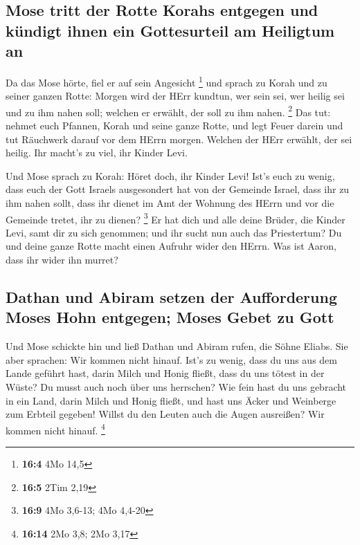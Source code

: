 \hypertarget{mose-tritt-der-rotte-korahs-entgegen-und-kuxfcndigt-ihnen-ein-gottesurteil-am-heiligtum-an}{%
\subsection{Mose tritt der Rotte Korahs entgegen und kündigt ihnen ein
Gottesurteil am Heiligtum
an}\label{mose-tritt-der-rotte-korahs-entgegen-und-kuxfcndigt-ihnen-ein-gottesurteil-am-heiligtum-an}}

 Da das Mose hörte, fiel er auf sein Angesicht \footnote{\textbf{16:4}
  4Mo 14,5}  und sprach zu Korah und zu seiner ganzen
Rotte: Morgen wird der HErr kundtun, wer sein sei, wer heilig sei und zu
ihm nahen soll; welchen er erwählt, der soll zu ihm nahen. \footnote{\textbf{16:5}
  2Tim 2,19}  Das tut: nehmet euch Pfannen, Korah und
seine ganze Rotte,  und legt Feuer darein und tut
Räuchwerk darauf vor dem HErrn morgen. Welchen der HErr erwählt, der sei
heilig. Ihr macht's zu viel, ihr Kinder Levi.

 Und Mose sprach zu Korah: Höret doch, ihr Kinder Levi!
 Ist's euch zu wenig, dass euch der Gott Israels
ausgesondert hat von der Gemeinde Israel, dass ihr zu ihm nahen sollt,
dass ihr dienet im Amt der Wohnung des HErrn und vor die Gemeinde
tretet, ihr zu dienen? \footnote{\textbf{16:9} 4Mo 3,6-13; 4Mo 4,4-20}
 Er hat dich und alle deine Brüder, die Kinder Levi, samt
dir zu sich genommen; und ihr sucht nun auch das Priestertum?
 Du und deine ganze Rotte macht einen Aufruhr wider den
HErrn. Was ist Aaron, dass ihr wider ihn murret?

\hypertarget{dathan-und-abiram-setzen-der-aufforderung-moses-hohn-entgegen-moses-gebet-zu-gott}{%
\subsection{Dathan und Abiram setzen der Aufforderung Moses Hohn
entgegen; Moses Gebet zu
Gott}\label{dathan-und-abiram-setzen-der-aufforderung-moses-hohn-entgegen-moses-gebet-zu-gott}}

 Und Mose schickte hin und ließ Dathan und Abiram rufen,
die Söhne Eliabs. Sie aber sprachen: Wir kommen nicht hinauf.
 Ist's zu wenig, dass du uns aus dem Lande geführt hast,
darin Milch und Honig fließt, dass du uns tötest in der Wüste? Du musst
auch noch über uns herrschen?  Wie fein hast du uns
gebracht in ein Land, darin Milch und Honig fließt, und hast uns Äcker
und Weinberge zum Erbteil gegeben! Willst du den Leuten auch die Augen
ausreißen? Wir kommen nicht hinauf. \footnote{\textbf{16:14} 2Mo 3,8;
  2Mo 3,17}

